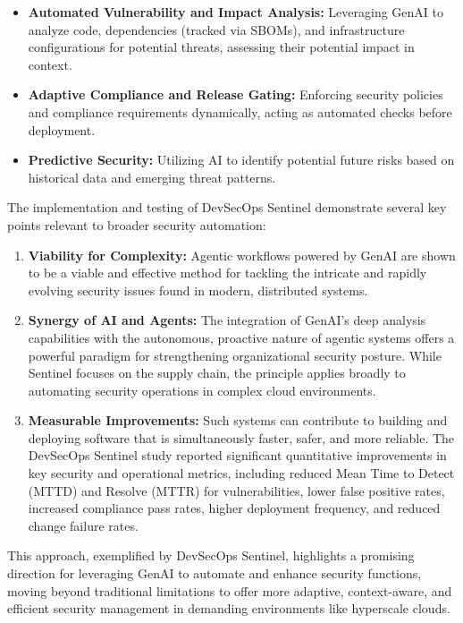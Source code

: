 \begin{itemize}
    \item \textbf{Automated Vulnerability and Impact Analysis:} Leveraging GenAI to analyze code, dependencies (tracked via SBOMs), and infrastructure configurations for potential threats, assessing their potential impact in context\cite{noauthor_devsecops_nodate}.
    \item \textbf{Adaptive Compliance and Release Gating:} Enforcing security policies and compliance requirements dynamically, acting as automated checks before deployment\cite{noauthor_devsecops_nodate}.
    \item \textbf{Predictive Security:} Utilizing AI to identify potential future risks based on historical data and emerging threat patterns\cite{noauthor_devsecops_nodate}.
\end{itemize}

The implementation and testing of DevSecOps Sentinel demonstrate several key points relevant to broader security automation:

\begin{enumerate}
    \item \textbf{Viability for Complexity:} Agentic workflows powered by GenAI are shown to be a viable and effective method for tackling the intricate and rapidly evolving security issues found in modern, distributed systems\cite{noauthor_devsecops_nodate}.
    \item \textbf{Synergy of AI and Agents:} The integration of GenAI's deep analysis capabilities with the autonomous, proactive nature of agentic systems offers a powerful paradigm for strengthening organizational security posture\cite{noauthor_devsecops_nodate}. While Sentinel focuses on the supply chain, the principle applies broadly to automating security operations in complex cloud environments.
    \item \textbf{Measurable Improvements:} Such systems can contribute to building and deploying software that is simultaneously faster, safer, and more reliable. The DevSecOps Sentinel study reported significant quantitative improvements in key security and operational metrics, including reduced Mean Time to Detect (MTTD) and Resolve (MTTR) for vulnerabilities, lower false positive rates, increased compliance pass rates, higher deployment frequency, and reduced change failure rates\cite{noauthor_devsecops_nodate}.
\end{enumerate}

This approach, exemplified by DevSecOps Sentinel, highlights a promising direction for leveraging GenAI to automate and enhance security functions, moving beyond traditional limitations to offer more adaptive, context-aware, and efficient security management in demanding environments like hyperscale clouds.

